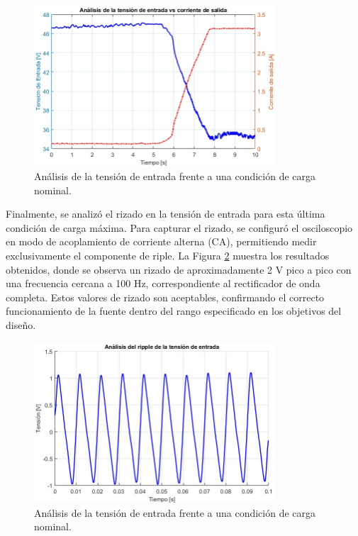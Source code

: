 \begin{figure}[H]
    \centering
    \includegraphics[width=0.8\textwidth]{./imagenes/Vrec_Isal.jpg}
    \caption{Análisis de la tensión de entrada frente a una condición de carga nominal.}
    \label{F:Vrec_Isal}
\end{figure}\par 

Finalmente, se analizó el rizado en la tensión de entrada para esta última condición de carga máxima. Para capturar el rizado, se configuró el osciloscopio en modo de acoplamiento de corriente alterna (CA), permitiendo medir exclusivamente el componente de riple. La Figura \ref{F:ripple} muestra los resultados obtenidos, donde se observa un rizado de aproximadamente 2 V pico a pico con una frecuencia cercana a 100 Hz, correspondiente al rectificador de onda completa. Estos valores de rizado son aceptables, confirmando el correcto funcionamiento de la fuente dentro del rango especificado en los objetivos del diseño.

\begin{figure}[H]
    \centering
    \includegraphics[width=0.8\textwidth]{./imagenes/ripple.jpg}
    \caption{Análisis de la tensión de entrada frente a una condición de carga nominal.}
    \label{F:ripple}
\end{figure}\par 


